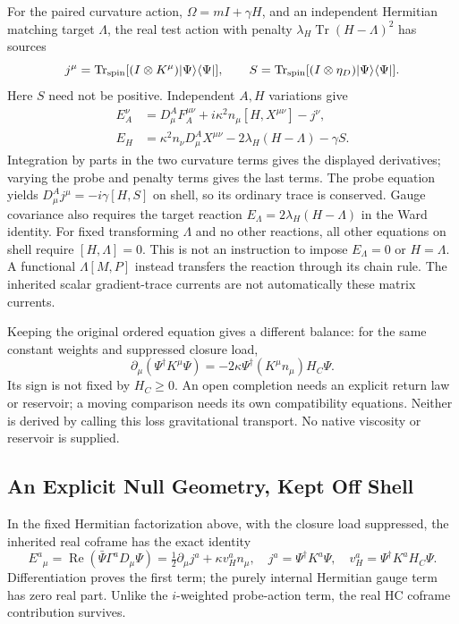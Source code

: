 For the paired curvature action, $\Omega=mI+\gamma H$, and an
independent Hermitian matching target $\Lambda$, the real test action
with penalty $\lambda_H\operatorname{Tr}(H-\Lambda)^2$ has sources
\[
 j^\mu=\operatorname{Tr}_{\rm spin}
       [(I\otimes K^\mu)|\Psi\rangle\langle\Psi|],\qquad
 S=\operatorname{Tr}_{\rm spin}
       [(I\otimes\eta_D)|\Psi\rangle\langle\Psi|].
\]
Here $S$ need not be positive. Independent $A,H$ variations give
\begin{align*}
 E_A^\nu&=D_\mu^AF_A^{\mu\nu}
          +i\kappa^2n_\mu[H,X^{\mu\nu}]-j^\nu,\\
 E_H&=\kappa^2n_\nu D_\mu^AX^{\mu\nu}
           -2\lambda_H(H-\Lambda)-\gamma S.
\end{align*}
Integration by parts in the two curvature terms gives the displayed
derivatives; varying the probe and penalty terms gives the last terms.
The probe equation yields $D_\mu^Aj^\mu=-i\gamma[H,S]$ on shell,
so its ordinary trace is conserved. Gauge covariance also requires
the target reaction $E_\Lambda=2\lambda_H(H-\Lambda)$ in the
Ward identity. For fixed transforming $\Lambda$ and no other
reactions, all other equations on shell require $[H,\Lambda]=0$.
This is not an instruction to impose $E_\Lambda=0$ or $H=\Lambda$.
A functional $\Lambda[M,P]$ instead transfers the reaction through
its chain rule. The inherited scalar gradient-trace currents are not
automatically these matrix currents.

Keeping the original ordered equation gives a different balance:
for the same constant weights and suppressed closure load,
\[
 \partial_\mu(\Psi^\dagger K^\mu\Psi)
       =-2\kappa\Psi^\dagger(K^\mu n_\mu)H_C\Psi.
\]
Its sign is not fixed by $H_C\geq0$. An open completion needs an
explicit return law or reservoir; a moving comparison needs its own
compatibility equations. Neither is derived by calling this loss
gravitational transport. No native viscosity or reservoir is supplied.

\subsection{An Explicit Null Geometry, Kept Off Shell}

In the fixed Hermitian factorization above, with the closure load
suppressed, the inherited real coframe has the exact identity
\[
 E^a{}_\mu=\operatorname{Re}(\bar\Psi\Gamma^aD_\mu\Psi)
       =\tfrac12\partial_\mu j^a+\kappa v_H^a n_\mu,
 \quad j^a=\Psi^\dagger K^a\Psi,\quad
 v_H^a=\Psi^\dagger K^aH_C\Psi.
\]
Differentiation proves the first term; the purely internal Hermitian
gauge term has zero real part. Unlike the $i$-weighted probe-action
term, the real HC coframe contribution survives.

